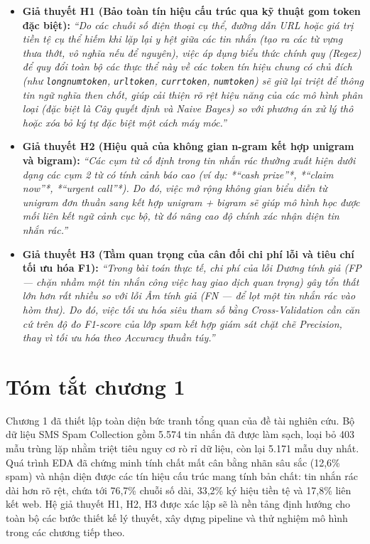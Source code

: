 \begin{itemize}
    \item \textbf{Giả thuyết H1 (Bảo toàn tín hiệu cấu trúc qua kỹ thuật gom token đặc biệt):}
    \textit{“Do các chuỗi số điện thoại cụ thể, đường dẫn URL hoặc giá trị tiền tệ cụ thể hiếm khi lặp lại y hệt giữa các tin nhắn (tạo ra các từ vựng thưa thớt, vô nghĩa nếu để nguyên), việc áp dụng biểu thức chính quy (Regex) để quy đổi toàn bộ các thực thể này về các token tín hiệu chung có chủ đích (như \texttt{longnumtoken}, \texttt{urltoken}, \texttt{currtoken}, \texttt{numtoken}) sẽ giữ lại triệt để thông tin ngữ nghĩa then chốt, giúp cải thiện rõ rệt hiệu năng của các mô hình phân loại (đặc biệt là Cây quyết định và Naive Bayes) so với phương án xử lý thô hoặc xóa bỏ ký tự đặc biệt một cách máy móc.”}
    
    \item \textbf{Giả thuyết H2 (Hiệu quả của không gian n-gram kết hợp unigram và bigram):}
    \textit{“Các cụm từ cố định trong tin nhắn rác thường xuất hiện dưới dạng các cụm 2 từ có tính cảnh báo cao (ví dụ: *“cash prize”*, *“claim now”*, *“urgent call”*). Do đó, việc mở rộng không gian biểu diễn từ unigram đơn thuần sang kết hợp unigram + bigram sẽ giúp mô hình học được mối liên kết ngữ cảnh cục bộ, từ đó nâng cao độ chính xác nhận diện tin nhắn rác.”}
    
    \item \textbf{Giả thuyết H3 (Tầm quan trọng của cân đối chi phí lỗi và tiêu chí tối ưu hóa F1):}
    \textit{“Trong bài toán thực tế, chi phí của lỗi Dương tính giả (FP --- chặn nhầm một tin nhắn công việc hay giao dịch quan trọng) gây tổn thất lớn hơn rất nhiều so với lỗi Âm tính giả (FN --- để lọt một tin nhắn rác vào hòm thư). Do đó, việc tối ưu hóa siêu tham số bằng Cross-Validation cần căn cứ trên độ đo F1-score của lớp spam kết hợp giám sát chặt chẽ Precision, thay vì tối ưu hóa theo Accuracy thuần túy.”}
\end{itemize}

\section{Tóm tắt chương 1}
Chương 1 đã thiết lập toàn diện bức tranh tổng quan của đề tài nghiên cứu. Bộ dữ liệu SMS Spam Collection gồm 5.574 tin nhắn đã được làm sạch, loại bỏ 403 mẫu trùng lặp nhằm triệt tiêu nguy cơ rò rỉ dữ liệu, còn lại 5.171 mẫu duy nhất. Quá trình EDA đã chứng minh tính chất mất cân bằng nhãn sâu sắc (12,6\% spam) và nhận diện được các tín hiệu cấu trúc mang tính bản chất: tin nhắn rác dài hơn rõ rệt, chứa tới 76,7\% chuỗi số dài, 33,2\% ký hiệu tiền tệ và 17,8\% liên kết web. Hệ giả thuyết H1, H2, H3 được xác lập sẽ là nền tảng định hướng cho toàn bộ các bước thiết kế lý thuyết, xây dựng pipeline và thử nghiệm mô hình trong các chương tiếp theo.